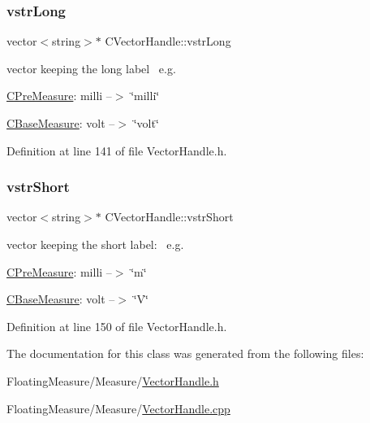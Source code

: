 \subsubsection{\texorpdfstring{vstr\+Long}{vstrLong}}
{\footnotesize\ttfamily vector$<$string$>$$\ast$ C\+Vector\+Handle\+::vstr\+Long\hspace{0.3cm}{\ttfamily [protected]}}



vector keeping the long label~\newline
 e.\+g. 


\begin{DoxyItemize}
\item \hyperlink{classCPreMeasure}{C\+Pre\+Measure}\+: milli --$>$ \char`\"{}milli\char`\"{}
\item \hyperlink{classCBaseMeasure}{C\+Base\+Measure}\+: volt --$>$ \char`\"{}volt\char`\"{} 
\end{DoxyItemize}

Definition at line 141 of file Vector\+Handle.\+h.

\mbox{\label{classCVectorHandle_afb50c8a33d4cf70bf92c644dca409ea2}} 
\subsubsection{\texorpdfstring{vstr\+Short}{vstrShort}}
{\footnotesize\ttfamily vector$<$string$>$$\ast$ C\+Vector\+Handle\+::vstr\+Short\hspace{0.3cm}{\ttfamily [protected]}}



vector keeping the short label\+:~\newline
 e.\+g. 


\begin{DoxyItemize}
\item \hyperlink{classCPreMeasure}{C\+Pre\+Measure}\+: milli --$>$ \char`\"{}m\char`\"{}
\item \hyperlink{classCBaseMeasure}{C\+Base\+Measure}\+: volt --$>$ \char`\"{}\+V\char`\"{} 
\end{DoxyItemize}

Definition at line 150 of file Vector\+Handle.\+h.



The documentation for this class was generated from the following files\+:\begin{DoxyCompactItemize}
\item 
Floating\+Measure/\+Measure/\hyperlink{VectorHandle_8h}{Vector\+Handle.\+h}\item 
Floating\+Measure/\+Measure/\hyperlink{VectorHandle_8cpp}{Vector\+Handle.\+cpp}\end{DoxyCompactItemize}
